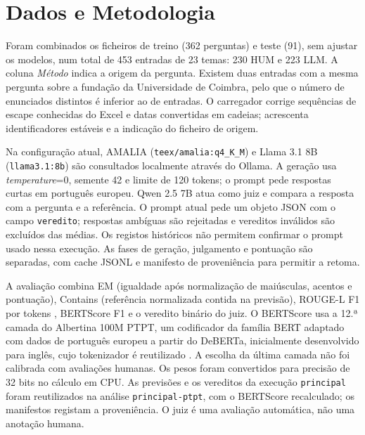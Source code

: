 \section{Dados e Metodologia}

Foram combinados os ficheiros de treino (362 perguntas) e teste (91), sem ajustar os modelos, num total de 453 entradas de 23 temas: 230 HUM e 223 LLM. A coluna \textit{Método} indica a origem da pergunta. Existem duas entradas com a mesma pergunta sobre a fundação da Universidade de Coimbra, pelo que o número de enunciados distintos é inferior ao de entradas. O carregador corrige sequências de escape conhecidas do Excel e datas convertidas em cadeias; acrescenta identificadores estáveis e a indicação do ficheiro de origem.

Na configuração atual, AMALIA (\texttt{teex/amalia:q4\_K\_M}) e Llama 3.1 8B (\texttt{llama3.1:8b}) são consultados localmente através do Ollama. A geração usa \textit{temperature}=0, semente 42 e limite de 120 tokens; o prompt pede respostas curtas em português europeu. Qwen 2.5 7B atua como juiz e compara a resposta com a pergunta e a referência. O prompt atual pede um objeto JSON com o campo \texttt{veredito}; respostas ambíguas são rejeitadas e vereditos inválidos são excluídos das médias. Os registos históricos não permitem confirmar o prompt usado nessa execução. As fases de geração, julgamento e pontuação são separadas, com cache JSONL e manifesto de proveniência para permitir a retoma.

A avaliação combina EM (igualdade após normalização de maiúsculas, acentos e pontuação), Contains (referência normalizada contida na previsão), ROUGE-L F1 por tokens \cite{lin_rouge_2004}, BERTScore F1 \cite{zhang_bertscore_2020} e o veredito binário do juiz. O BERTScore usa a 12.ª camada do Albertina 100M PTPT, um codificador da família BERT adaptado com dados de português europeu a partir do DeBERTa, inicialmente desenvolvido para inglês, cujo tokenizador é reutilizado \cite{santos_albertina_2024}. A escolha da última camada não foi calibrada com avaliações humanas. Os pesos foram convertidos para precisão de 32 bits no cálculo em CPU. As previsões e os vereditos da execução \texttt{principal} foram reutilizados na análise \texttt{principal-ptpt}, com o BERTScore recalculado; os manifestos registam a proveniência. O juiz é uma avaliação automática, não uma anotação humana.
